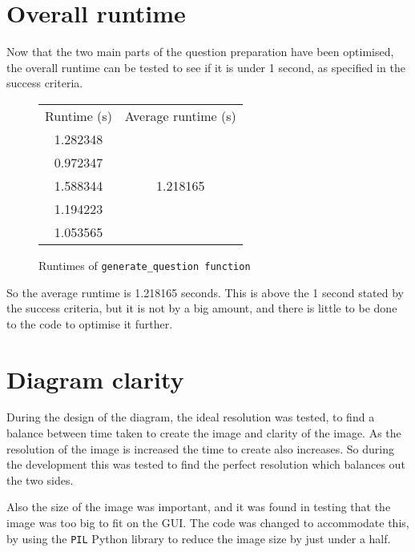 \section{Overall runtime}
Now that the two main parts of the question preparation have been optimised, the overall runtime can be tested to see if it is under 1 second, as specified in the success criteria. 
\begin{figure}[H]
	\centering
	\begin{tabular}{|c|c|}
		\hline
		Runtime (s) & Average runtime (s)       \\
		
		1.282348    &  \multirow{5}{*}{1.218165}\\
		
		0.972347    &                           \\
		
		1.588344    &                           \\
		
		1.194223    &                           \\
	
		1.053565    &\\
		\hline       
	\end{tabular}
	\caption{Runtimes of \texttt{generate\_question function}}
\end{figure}
So the average runtime is 1.218165 seconds. This is above the 1 second stated by the success criteria, but it is not by a big amount, and there is little to be done to the code to optimise it further.
\section{Diagram clarity}
During the design of the diagram, the ideal resolution was tested, to find a balance between time taken to create the image and clarity of the image. As the resolution of the image is increased the time to create also increases. So during the development this was tested to find the perfect resolution which balances out the two sides. 

Also the size of the image was important, and it was found in testing that the image was too big to fit on the GUI. The code was changed to accommodate this, by using the \texttt{PIL} Python library to reduce the image size by just under a half.